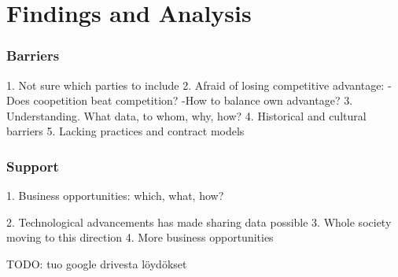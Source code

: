 \chapter{Findings and Analysis}
\label{chapter:results}




\subsection{Barriers}
1. Not sure which parties to include
2. Afraid of losing competitive advantage:
	-Does coopetition beat competition?
	-How to balance own advantage?
3. Understanding. What data, to whom, why, how?
4. Historical and cultural barriers
5. Lacking practices and contract models


\subsection{Support}

1. Business opportunities:
which, what, how?


2. Technological advancements has made sharing data possible
3. Whole society moving to this direction
4. More business opportunities






TODO: tuo google drivesta löydökset